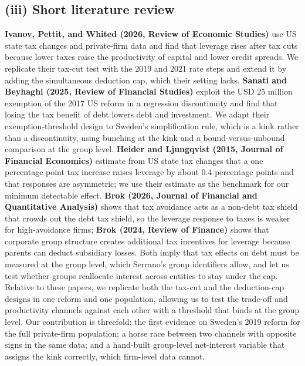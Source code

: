 \documentclass[12pt,a4paper]{article}
\begin{document}
\subsection{(iii) Short literature review}

\textbf{Ivanov, Pettit, and Whited (2026, Review of Economic Studies)} use US state tax changes and private-firm data and find that leverage rises after tax cuts because lower taxes raise the productivity of capital and lower credit spreads. We replicate their tax-cut test with the 2019 and 2021 rate steps and extend it by adding the simultaneous deduction cap, which their setting lacks. \textbf{Sanati and Beyhaghi (2025, Review of Financial Studies)} exploit the USD 25 million exemption of the 2017 US reform in a regression discontinuity and find that losing the tax benefit of debt lowers debt and investment. We adapt their exemption-threshold design to Sweden's simplification rule, which is a kink rather than a discontinuity, using bunching at the kink and a bound-versus-unbound comparison at the group level. \textbf{Heider and Ljungqvist (2015, Journal of Financial Economics)} estimate from US state tax changes that a one percentage point tax increase raises leverage by about 0.4 percentage points and that responses are asymmetric; we use their estimate as the benchmark for our minimum detectable effect. \textbf{Brok (2026, Journal of Financial and Quantitative Analysis)} shows that tax avoidance acts as a non-debt tax shield that crowds out the debt tax shield, so the leverage response to taxes is weaker for high-avoidance firms; \textbf{Brok (2024, Review of Finance)} shows that corporate group structure creates additional tax incentives for leverage because parents can deduct subsidiary losses. Both imply that tax effects on debt must be measured at the group level, which Serrano's group identifiers allow, and let us test whether groups reallocate interest across entities to stay under the cap. Relative to these papers, we replicate both the tax-cut and the deduction-cap designs in one reform and one population, allowing us to test the trade-off and productivity channels against each other with a threshold that binds at the group level. Our contribution is threefold: the first evidence on Sweden's 2019 reform for the full private-firm population; a horse race between two channels with opposite signs in the same data; and a hand-built group-level net-interest variable that assigns the kink correctly, which firm-level data cannot.
\end{document}
